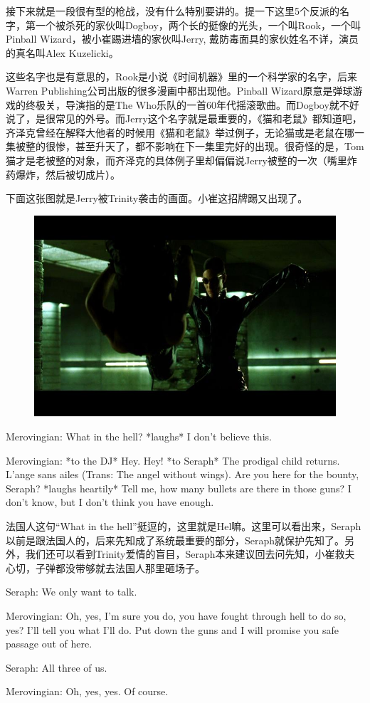 \documentclass[UTF8]{ctexart}
\newenvironment{myquote}{\color{green} \setlength{\leftskip}{6em} \setlength{\rightskip}{4em} \setlength{\parindent}{-2em}}{\par}
\begin{document}
接下来就是一段很有型的枪战，没有什么特别要讲的。提一下这里5个反派的名字，第一个被杀死的家伙叫Dogboy，两个长的挺像的光头，一个叫Rook，一个叫Pinball Wizard，被小崔踢进墙的家伙叫Jerry, 戴防毒面具的家伙姓名不详，演员的真名叫Alex Kuzelicki。

这些名字也是有意思的，Rook是小说《时间机器》里的一个科学家的名字，后来Warren Publishing公司出版的很多漫画中都出现他。Pinball Wizard原意是弹球游戏的终极关，导演指的是The Who乐队的一首60年代摇滚歌曲。而Dogboy就不好说了，是很常见的外号。而Jerry这个名字就是最重要的，《猫和老鼠》都知道吧，齐泽克曾经在解释大他者的时候用《猫和老鼠》举过例子，无论猫或是老鼠在哪一集被整的很惨，甚至升天了，都不影响在下一集里完好的出现。很奇怪的是，Tom猫才是老被整的对象，而齐泽克的具体例子里却偏偏说Jerry被整的一次（嘴里炸药爆炸，然后被切成片）。

下面这张图就是Jerry被Trinity袭击的画面。小崔这招牌踢又出现了。

\begin{figure}[htb]
\centering
\includegraphics[width=0.5\linewidth]{fig/328dcf1b4553d7faaf5133cc.jpg}
\end{figure}

\begin{myquote}
Merovingian: What in the hell? *laughs* I don't believe this.

Merovingian: *to the DJ* Hey. Hey! *to Seraph* The prodigal child returns. L'ange sans ailes (Trans: The angel without wings). Are you here for the bounty, Seraph? *laughs heartily* Tell me, how many bullets are there in those guns? I don't know, but I don't think you have enough.
\end{myquote}

法国人这句“What in the hell”挺逗的，这里就是Hel嘛。这里可以看出来，Seraph以前是跟法国人的，后来先知成了系统最重要的部分，Seraph就保护先知了。另外，我们还可以看到Trinity爱情的盲目，Seraph本来建议回去问先知，小崔救夫心切，子弹都没带够就去法国人那里砸场子。

\begin{myquote}
Seraph: We only want to talk.

Merovingian: Oh, yes, I'm sure you do, you have fought through hell to do so, yes? I'll tell you what I'll do. Put down the guns and I will promise you safe passage out of here.

Seraph: All three of us.

Merovingian: Oh, yes, yes. Of course.
\end{myquote}
\end{document}
